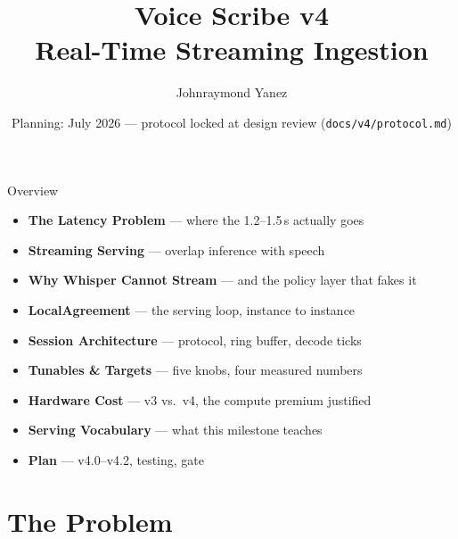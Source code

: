 \documentclass{beamer}
\title[Voice Scribe v4]{Voice Scribe v4\\Real-Time Streaming Ingestion}
\author[J. Yanez]{Johnraymond Yanez}
\institute[Voice Scribe]{Voice Scribe}
\date{Planning: July 2026 --- protocol locked at design review (\texttt{docs/v4/protocol.md})}
\begin{document}
\begin{frame}
\small{\titlepage}
\end{frame}


\begin{frame}{Overview}
    \begin{itemize}
        \item \textbf{The Latency Problem} --- where the 1.2--1.5\,s actually goes
        \item \textbf{Streaming Serving} --- overlap inference with speech
        \item \textbf{Why Whisper Cannot Stream} --- and the policy layer that fakes it
        \item \textbf{LocalAgreement} --- the serving loop, instance to instance
        \item \textbf{Session Architecture} --- protocol, ring buffer, decode ticks
        \item \textbf{Tunables \& Targets} --- five knobs, four measured numbers
        \item \textbf{Hardware Cost} --- v3 vs.\ v4, the compute premium justified
        \item \textbf{Serving Vocabulary} --- what this milestone teaches
        \item \textbf{Plan} --- v4.0--v4.2, testing, gate
    \end{itemize}
\end{frame}


\section{The Problem}
\end{document}
